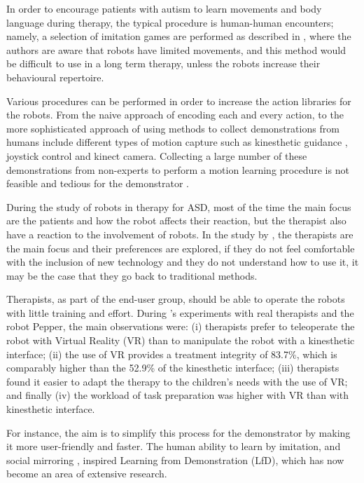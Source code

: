 \documentclass[thesis]{mas_proposal}
\begin{document}
\begin{itemize}
    In order to encourage patients with autism to learn movements and body language during therapy, the typical procedure is human-human encounters; namely, a selection of imitation games are performed as described in \cite{dautenhahn2004}, where the authors are aware that robots have limited movements, and this method would be difficult to use in a long term therapy, unless the robots increase their behavioural repertoire.
    
    Various procedures can be performed in order to increase the action libraries for the robots. From the naive approach of encoding each and every action, to the more sophisticated approach of using methods to collect demonstrations from humans include different types of motion capture such as kinesthetic guidance \cite{kronander2013}, joystick control \cite{Jiang2013} and kinect camera\cite{assad2020}. Collecting a large number of these demonstrations from non-experts to perform a motion learning procedure is not feasible and tedious for the demonstrator \cite{Chen2022}.
    
    During the study of robots in therapy for ASD, most of the time the main focus are the patients and how the robot affects their reaction, but the therapist also have a reaction to the involvement of robots. In the study by \cite{kulikovskiy2021}, the therapists are the main focus and their preferences are explored, if they do not feel comfortable with the inclusion of new technology and they do not understand how to use it, it may be the case that they go back to traditional methods.
    
    Therapists, as part of the end-user group, should be able to operate the robots with little training and effort. During \cite{kulikovskiy2021}'s experiments with real therapists and the robot Pepper, the main observations were: (i) therapists prefer to teleoperate the robot with Virtual Reality (VR) than to manipulate the robot with a kinesthetic interface; (ii) the use of VR provides a treatment integrity of 83.7\%, which is comparably higher than the 52.9\% of the kinesthetic interface; (iii) therapists found it easier to adapt the therapy to the children's needs with the use of VR; and finally (iv) the workload of task preparation was higher with VR than with kinesthetic interface. 
       
    For instance, the aim is to simplify this process for the demonstrator by making it more user-friendly and faster. The human ability to learn by imitation, and social mirroring \cite{Byrne2005}, inspired Learning from Demonstration (LfD), which has now become an area of extensive research.
    

\end{itemize}
\end{document}
